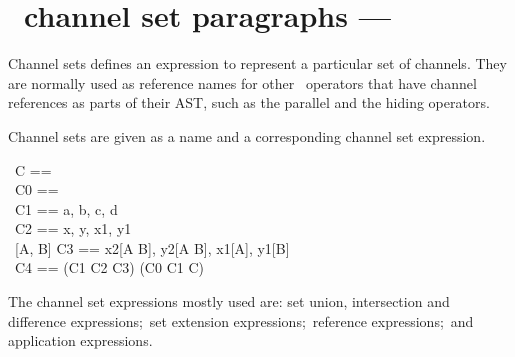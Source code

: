 \documentclass{article}
\begin{document}

\section{\Circus\ channel set paragraphs --- }

Channel sets defines an expression to represent a particular set of channels.
They are normally used as reference names for other \Circus\ operators that
have channel references as parts of their AST, such as the parallel and the
hiding operators.

Channel sets are given as a name and a corresponding channel set expression.
%
\begin{circus}
    \circchannelset\ C == \emptyset \\
    \circchannelset\ C0 == \lchanset \rchanset \\
    \circchannelset\ C1 == \lchanset a, b, c, d \rchanset \\
    \circchannelset\ C2 == \lchanset x, y, x1, y1 \rchanset \\
    \circchannelset\ [A, B] C3 == \lchanset x2[A \cross B], y2[A \fun B], x1[A], y1[B] \rchanset \\
    \circchannelset\ C4 == (C1 \cup C2 \cap C3) \setminus (C0 \cup C1 \cup C)
\end{circus}%

The channel set expressions mostly used are: set union, intersection and
difference expressions;~set extension expressions;~reference expressions;~and
application expressions.
\end{document}
